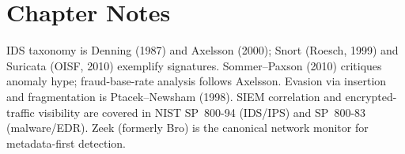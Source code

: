 \section*{Chapter Notes}
IDS taxonomy is Denning (1987) and Axelsson (2000); Snort (Roesch, 1999) and
Suricata (OISF, 2010) exemplify signatures. Sommer--Paxson (2010) critiques
anomaly hype; fraud-base-rate analysis follows Axelsson. Evasion via insertion
and fragmentation is Ptacek--Newsham (1998). SIEM correlation and encrypted-
traffic visibility are covered in NIST SP~800-94 (IDS/IPS) and SP~800-83
(malware/EDR). Zeek (formerly Bro) is the canonical network monitor for
metadata-first detection.
